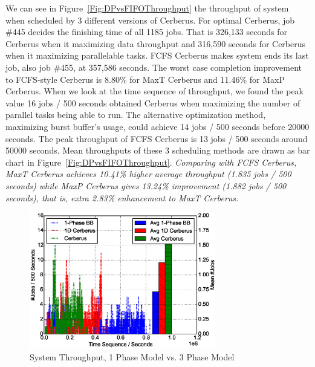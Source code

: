 We can see in Figure~\ref{Fig:DPvsFIFOThroughput} the throughput of system
when scheduled by 3 different versions of Cerberus.
For optimal Cerberus, job \#445 decides the finishing time of all 1185 jobs.
That is 326,133 seconds for Cerberus when it maximizing data throughput
and 316,590 seconds for Cerberus when it maximizing parallelable tasks.
FCFS Cerberus makes system ends its last job, also job \#455, at 357,586 seconds.
The worst case completion improvement to FCFS-style Cerberus is
8.80\% for MaxT Cerberus and 11.46\% for MaxP Cerberus.
When we look at the time sequence of throughput,
we found the peak value 16 jobs / 500 seconds obtained Cerberus
when maximizing the number of parallel tasks being able to run.
The alternative optimization method, maximizing burst buffer's usage,
could achieve 14 jobs / 500 seconds before 20000 seconds.
The peak throughput of FCFS Cerberus is 13 jobs / 500 seconds around 50000 seconds.
Mean throughputs of these 3 scheduling methods are drawn
as bar chart in Figure~\ref{Fig:DPvsFIFOThroughput}.
\textit{Comparing with FCFS Cerberus, MaxT Cerberus achieves
10.41\% higher average throughput (1.835 jobs / 500 seconds)
while MaxP Cerberus gives 13.24\% improvement (1.882 jobs / 500 seconds),
that is, extra 2.83\% enhancement to MaxT Cerberus.}

\begin{figure}[!t]
        \centering
        \includegraphics[width=3.2in]{3Pvs1PFigures/1000jobs_3p_vs_1p_throughput}
        \caption{System Throughput, 1 Phase Model vs. 3 Phase Model}
        \label{Fig:3Pvs1PThroughput}
\end{figure}

